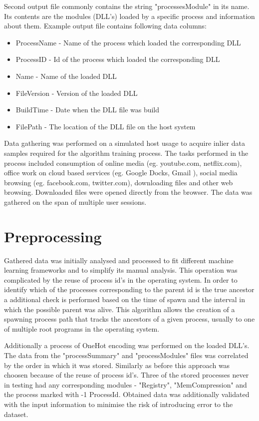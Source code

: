 \documentclass[a4paper,twoside,12pt]{book}
\begin{document}
Second output file commonly contains the string "processesModule" in its name. Its contents
are the modules (DLL's) loaded by a specific process and information about them. Example 
output file contains following data columns:
\begin{itemize}
	\item ProcessName - Name of the process which loaded the corresponding DLL
	\item ProcessID - Id of the process which loaded the corresponding DLL
	\item Name - Name of the loaded DLL
	\item FileVersion - Version of the loaded DLL
	\item BuildTime - Date when the DLL file was build
	\item FilePath - The location of the DLL file on the host system
\end{itemize}

Data gathering was performed on a simulated host usage to acquire inlier data samples required 
for the algorithm training process. The tasks performed in the process 
included consumption of online media (eg. youtube.com, netflix.com), office work on cloud 
based services (eg. Google Docks, Gmail ), social media browsing (eg. facebook.com, 
twitter.com), downloading files and other web browsing. Downloaded files were opened 
directly from the browser. The data was gathered on the span of multiple user sessions.

\section{Preprocessing}

Gathered data was initially analysed and processed to fit different machine learning 
frameworks and to simplify its manual analysis. This operation was complicated by the 
reuse of process id's in the operating system. In order to identify which of the processes 
corresponding to the parent id is the true ancestor a additional check is performed based 
on the time of spawn and the interval in which the possible parent was alive. This algorithm 
allows the creation of a spawning process path that tracks the ancestors of a given process, 
usually to one of multiple root programs in the operating system. 

Additionally a process of OneHot encoding was performed on the loaded DLL's. The data from 
the "processSummary" and "processModules" files was correlated by the order in which it was 
stored. Similarly as before this approach was choosen because of the reuse of process id's.
Three of the stored processes never in testing had any corresponding modules - 
"Registry", "MemCompression" and the process marked with -1 ProcessId. Obtained data was
additionally validated with the input information to minimise the risk of introducing error
to the dataset.
\end{document}
